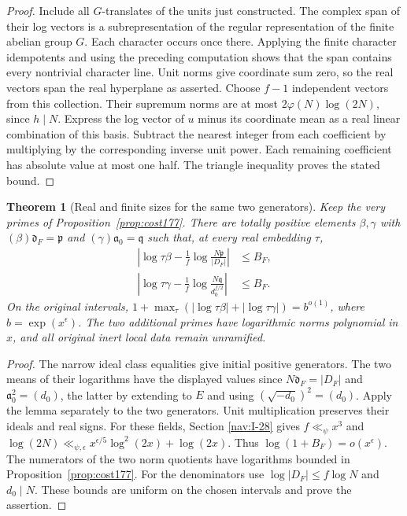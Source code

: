 \documentclass[a4paper,11pt]{article}
\newtheorem{theorem}[proposition]{Theorem}
\theoremstyle{definition}
\theoremstyle{remark}
\numberwithin{equation}{section}
\begin{document}
\begin{proof}
Include all \(G\)-translates of the units just constructed.
The complex span of their log vectors is a subrepresentation
of the regular representation of the finite abelian group
\(G\). Each character occurs once there. Applying the finite
character idempotents and using the preceding computation
shows that the span contains every nontrivial character
line. Unit norms give coordinate sum zero, so the real
vectors span the real hyperplane as asserted. Choose
\(f-1\) independent vectors from this collection. Their
supremum norms are at most \(2\varphi(N)\log(2N)\), since
\(h\mid N\). Express the log vector of \(u\) minus its
coordinate mean as a real linear combination of this basis.
Subtract the nearest integer from each coefficient by
multiplying by the corresponding inverse unit power. Each
remaining coefficient has absolute value at most one half.
The triangle inequality proves the stated bound.
\end{proof}

\begin{theorem}[Real and finite sizes for the same two generators]
\label{thm:balanced179}
Keep the very primes of Proposition~\ref{prop:cost177}. There
are totally positive elements \(\beta,\gamma\) with
\((\beta)\mathfrak d_F=\mathfrak p\) and
\((\gamma)\mathfrak a_0=\mathfrak q\) such that, at every
real embedding \(\tau\),
\begin{align*}
 \left|\log\tau\beta-\frac1f\log
       \frac{N\mathfrak p}{|D_F|}\right|&\le B_F,\\
 \left|\log\tau\gamma-\frac1f\log
       \frac{N\mathfrak q}{d_0^{f/2}}\right|&\le B_F.
\end{align*}
On the original intervals,
\(1+\max_\tau(|\log\tau\beta|+|\log\tau\gamma|)
= b^{o(1)}\), where \(b=\exp(x^\epsilon)\).
The two additional primes have logarithmic norms polynomial
in \(x\), and all original inert local data remain unramified.
\end{theorem}
\begin{proof}
The narrow ideal class equalities give initial positive
generators. The two means of their logarithms have the
displayed values since \(N\mathfrak d_F=|D_F|\) and
\(\mathfrak a_0^2=(d_0)\), the latter by extending to
\(E\) and using \((\sqrt{-d_0})^2=(d_0)\).
Apply the lemma separately to the two generators. Unit
multiplication preserves their ideals and real signs.
For these fields, Section \ref{nav:I-28} gives \(f\ll_\psi x^3\)
and \(\log(2N)\ll_{\psi,\epsilon} x^{\epsilon/5}
\log^2(2x)+\log(2x)\). Thus \(\log (1+B_F)=o(x^\epsilon)\).
The numerators of the two norm quotients have logarithms
bounded in Proposition~\ref{prop:cost177}. For the denominators
use \(\log|D_F|\le f\log N\) and \(d_0\mid N\). These bounds
are uniform on the chosen intervals and prove the assertion.
\end{proof}
\end{document}
